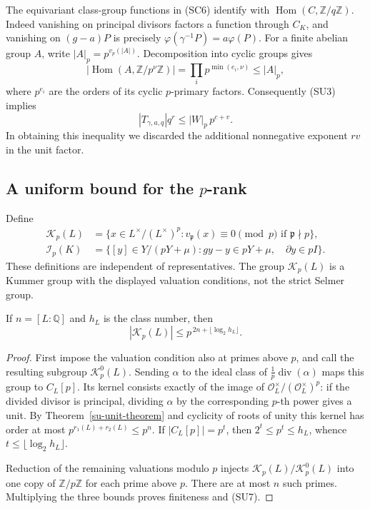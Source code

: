The equivariant class-group functions in (SC6) identify with
$\operatorname{Hom}(C,\mathbb Z/q\mathbb Z)$.
Indeed vanishing on principal divisors factors a function
through $C_K$, and vanishing on $(g-a)P$ is precisely
$\varphi(\gamma^{-1}P)=a\varphi(P)$.
For a finite abelian group $A$, write $|A|_p=p^{v_p(|A|)}$.
Decomposition into cyclic groups gives
\[
 |\operatorname{Hom}(A,\mathbb Z/p^\nu\mathbb Z)|
        =\prod_i p^{\min(e_i,\nu)}\le |A|_p,
 \tag{SU4}
\]
where $p^{e_i}$ are the orders of its cyclic $p$-primary
factors.  Consequently (SU3) implies
\[
            |T_{\gamma,a,q}|q^r
                   \le |W|_p\,p^{c+v}.
                   \tag{SU5}
\]
In obtaining this inequality we discarded the additional
nonnegative exponent $rv$ in the unit factor.

\subsection{A uniform bound for the \texorpdfstring{$p$}{p}-rank}

Define
\[
 \begin{split}
 \mathcal K_p(L)
   &=\{x\in L^\times/(L^\times)^p:
                 v_{\mathfrak p}(x)\equiv0\pmod p
                       \text{ if }\mathfrak p\nmid p\},\\
 \mathcal I_p(K)
   &=\{[y]\in Y/(pY+\mu):
            gy-y\in pY+\mu,\quad \partial y\in pI\}.
 \end{split}
 \tag{SU6}
\]
These definitions are independent of representatives.
The group $\mathcal K_p(L)$ is a Kummer group with the
displayed valuation conditions, not the strict Selmer group.

\begin{lemma}\label{su-base-kummer}
If $n=[L:\mathbb Q]$ and $h_L$ is the class number, then
\[
           |\mathcal K_p(L)|
                \le p^{\,2n+\lfloor\log_2h_L\rfloor}.
                \tag{SU7}
\]
\end{lemma}
\begin{proof}
First impose the valuation condition also at primes above
$p$, and call the resulting subgroup $\mathcal K_p^0(L)$.
Sending $\alpha$ to the ideal class of
$\frac1p\operatorname{div}(\alpha)$ maps this group to
$C_L[p]$.  Its kernel consists exactly of the image of
$\mathcal O_L^\times/(\mathcal O_L^\times)^p$:
if the divided divisor is principal, dividing $\alpha$
by the corresponding $p$-th power gives a unit.
By Theorem~\ref{su-unit-theorem} and cyclicity of roots of unity this
kernel has order at most $p^{r_1(L)+r_2(L)}\le p^n$.
If $|C_L[p]|=p^t$, then $2^t\le p^t\le h_L$, whence
$t\le\lfloor\log_2h_L\rfloor$.

Reduction of the remaining valuations modulo $p$ injects
$\mathcal K_p(L)/\mathcal K_p^0(L)$ into one copy of
$\mathbb Z/p\mathbb Z$ for each prime above $p$.
There are at most $n$ such primes.
Multiplying the three bounds proves finiteness and (SU7).
\end{proof}

